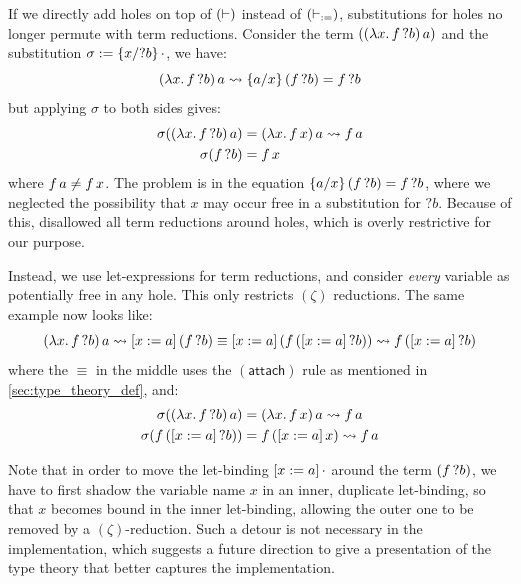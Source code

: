 \documentclass[twoside]{report}
\begin{document}
\begin{example}
    If we directly add holes on top of $(\vdasho)$ instead of $(\vdashd)$, substitutions for holes no longer permute with term reductions. Consider the term $(\app {(\lam x {\app f {?b}})} a)$ and the substitution $\sigma \defeq \subst {?b} {x} {\cdot}$, we have:
    $$
        \app {(\lam x {\app f {?b}})} a \rightsquigarrow \subst x a {(\app f {?b})} = \app f {?b}
    $$
    but applying $\sigma$ to both sides gives:
    $$
        \begin{aligned}
            \sigma(\app {(\lam x {\app f {?b}})} a) & = \app {(\lam x {\app f x})} a \rightsquigarrow \app f a \\
            \sigma(\app f {?b})                     & = \app f x                                               \\
        \end{aligned}
    $$
    where $\app f a \neq \app f x$. The problem is in the equation $\subst x a {(\app f {?b})} = \app f {?b}$, where we neglected the possibility that $x$ may occur free in a substitution for ${?b}$. Because of this, \cite{mcbride2000dependently} disallowed all term reductions around holes, which is overly restrictive for our purpose.

    Instead, we use let-expressions for term reductions, and consider \emph{every} variable as potentially free in any hole. This only restricts $(\zeta)$ reductions. The same example now looks like:
    $$
        \app {(\lam x {\app f {?b}})} a \rightsquigarrow \llet x a {(\app f {?b})} \equiv \llet x a {(\app f {(\llet x a {?b})})} \rightsquigarrow \app f {(\llet x a {?b})}
    $$
    where the $\equiv$ in the middle uses the $(\mathsf{attach})$ rule as mentioned in \cref{sec:type_theory_def}, and:
    $$
        \begin{aligned}
            \sigma(\app {(\lam x {\app f {?b}})} a) & = \app {(\lam x {\app f x})} a \rightsquigarrow \app f a \\
            \sigma(\app f {(\llet x a {?b})})       & = \app f {(\llet x a x)} \rightsquigarrow \app f a       \\
        \end{aligned}
    $$
\end{example}
Note that in order to move the let-binding $\llet x a {\cdot}$ around the term $(\app f {?b})$, we have to first shadow the variable name $x$ in an inner, duplicate let-binding, so that $x$ becomes bound in the inner let-binding, allowing the outer one to be removed by a $(\zeta)$-reduction. Such a detour is not necessary in the implementation, which suggests a future direction to give a presentation of the type theory that better captures the implementation.
\end{document}
